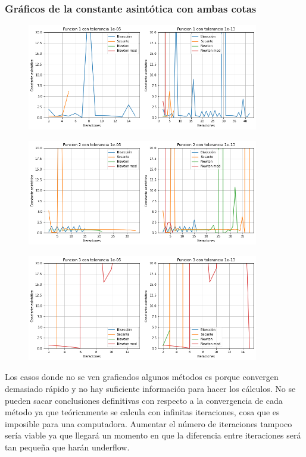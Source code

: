 \documentclass[titlepage,a4paper]{article}
\begin{document}
\subsubsection{Gráficos de la constante asintótica con ambas cotas}
\begin{figure}[H]
  \centering
    \includegraphics[width=0.9\textwidth]{asinf1.png}
\end{figure}
\begin{figure}[H]
  \centering
    \includegraphics[width=0.9\textwidth]{asinf2.png}
\end{figure}
\begin{figure}[H]
  \centering
    \includegraphics[width=0.9\textwidth]{asinf3.png}
\end{figure}

Los casos donde no se ven graficados algunos métodos es porque convergen demasiado rápido y no hay suficiente información para hacer los cálculos.
No se pueden sacar conclusiones definitivas con respecto a la convergencia de cada método ya que teóricamente se calcula con infinitas iteraciones, cosa que es imposible para una computadora. Aumentar el número de iteraciones tampoco sería viable ya que llegará un momento en que la diferencia entre iteraciones será tan pequeña que harán underflow.
\end{document}
